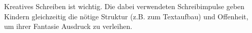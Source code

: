 Kreatives Schreiben ist wichtig.
Die dabei verwendeten Schreibimpulse geben Kindern gleichzeitig die nötige Struktur (z.B. zum Textaufbau) und Offenheit, um ihrer Fantasie Ausdruck zu verleihen.